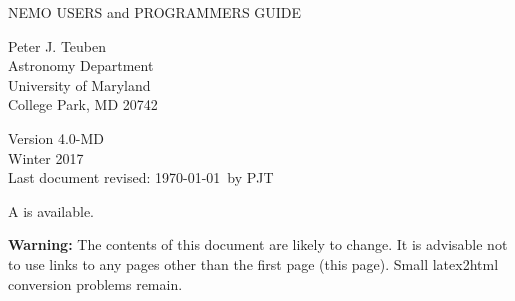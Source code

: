 \newpage
\thispagestyle{empty}
                                                                                        
\begin{flushright}
\vspace*{2.5in}
{\huge NEMO }
\vspace{0.5in}
{\huge USERS and PROGRAMMERS GUIDE}
\vspace{1in}


{\Large
Peter J. Teuben\\
Astronomy Department \\
University of Maryland \\
College Park, MD 20742
}

\vspace{1in}

{\small Version 4.0-MD} \\
{\small Winter 2017} \\
{\small Last document revised: \today\ by PJT} 

\end{flushright}


\setlength{\parindent}{0pt}
\setlength{\parskip}{2.5mm}

%
\begin{htmlonly}
A 
is available. 

{\bf Warning:} The contents of this document are likely to change.
It is advisable not to use links to any pages other than the first
page (this page). Small latex2html conversion problems remain.
\end{htmlonly}

%


\pagestyle{empty}
\newpage

